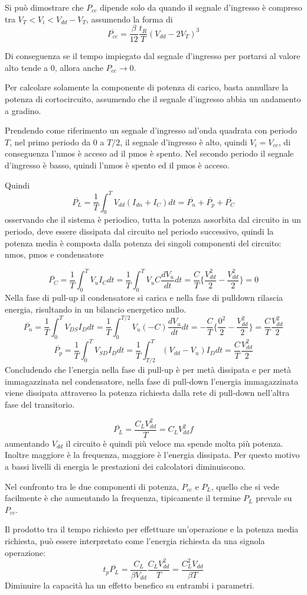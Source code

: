 \documentclass[../template]{subfiles}
\begin{document}
Si può dimostrare che $P_{cc}$ dipende solo da quando il segnale d'ingresso è compreso tra $V_T < V_i < V_{dd} - V_T$, assumendo la forma di
\[
    \overline{P_{cc}} = \frac{\beta}{12} \frac{t_R}{T} (V_{dd} - 2 V_T)^3
\]

Di conseguenza se il tempo impiegato dal segnale d'ingresso per portarsi al valore alto tende a $0$, allora anche $P_{cc} \to 0$.

Per calcolare solamente la componente di potenza di carico, basta annullare la potenza di cortocircuito, assumendo che il segnale d'ingresso abbia un andamento a gradino.

Prendendo come riferimento un segnale d'ingresso ad'onda quadrata con periodo $T$, nel primo periodo da $0$ a $T/2$, il segnale d'ingresso è alto, quindi $V_i = V_{cc}$, di conseguenza l'nmos è acceso ad il pmos è spento. Nel secondo periodo il segnale d'ingresso è basso, quindi l'nmos è spento ed il pmos è acceso.

Quindi
\[
    \overline{P_L} = \frac{1}{T} \int_0^T V_{dd} (I_{dn} + I_C) dt = \overline{P_n} + \overline{P_p} + \overline{P_C}
\]
osservando che il sistema è periodico, tutta la potenza assorbita dal circuito in un periodo, deve essere dissipata dal circuito nel periodo successivo, quindi la potenza media è composta dalla potenza dei singoli componenti del circuito: nmos, pmos e condensatore

\[
    \overline{P_C} = \frac{1}{T} \int_0^T V_u I_C dt = \frac{1}{T} \int_0^T V_u C \frac{dV_u}{dt} dt = \frac{C}{T} \big\{\frac{V_{dd}^2}{2} - \frac{V_{dd}^2}{2}\big\} = 0
\]
Nella fase di pull-up il condensatore si carica e nella fase di pulldown rilascia energia, risultando in un bilancio energetico nullo.
\[
    \overline{P_n} = \frac{1}{T} \int_0^T V_{DS} I_D dt = \frac{1}{T} \int_0 ^{T/2} V_u (-C) \frac{dV_u}{dt} dt = -\frac{C}{T} \big\{ \frac{0^2}{2} - \frac{V_{dd}^2}{2}\big\} = \frac{C}{T} \frac{V_{dd}^2}{2}
\]
\[
    \overline{P_p} = \frac{1}{T} \int_0^T V_{SD} I_D dt = \frac{1}{T} \int_{T/2}^T (V_{dd} - V_u) I_D dt = \frac{C}{T} \frac{V_{dd}^2}{2}
\]
Concludendo che l'energia nella fase di pull-up è per metà dissipata e per metà immagazzinata nel condensatore, nella fase di pull-down l'energia immagazzinata viene dissipata attraverso la potenza richiesta dalla rete di pull-down nell'altra fase del transitorio.

\[
    \overline{P_L} = \frac{C_L V_{dd}^2}{T} = C_L V_{dd}^2 f
\]
aumentando $V_{dd}$ il circuito è quindi più veloce ma spende molta più potenza. Inoltre maggiore è la frequenza, maggiore è l'energia dissipata. Per questo motivo a bassi livelli di energia le prestazioni dei calcolatori diminuiscono.

Nel confronto tra le due componenti di potenza, $P_{cc}$ e $P_L$, quello che si vede facilmente è che aumentando la frequenza, tipicamente il termine $P_L$ prevale su $P_{cc}$.

Il prodotto tra il tempo richiesto per effettuare un'operazione e la potenza media richiesta, può essere interpretato come l'energia richiesta da una signola operazione:
\[
    t_p \overline{P_L} = \frac{C_L}{\beta V_{dd}}\frac{C_L V_{dd}^2}{T} = \frac{C_L^2 V_{dd}}{\beta T}
\]
Diminuire la capacità ha un effetto benefico su entrambi i parametri.
\end{document}
